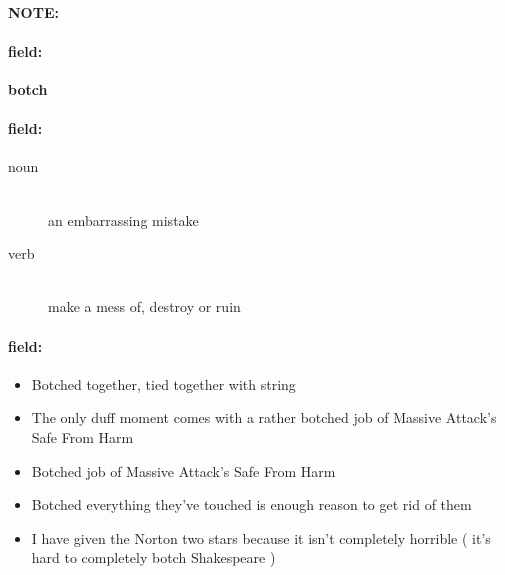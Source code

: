 \documentclass[12pt]{article}
\newenvironment{note}{\paragraph{NOTE:}}{}
\newenvironment{field}{\paragraph{field:}}{}
\begin{document}
\begin{note}
\begin{field}
\textbf{\large botch}
\end{field}


\begin{field}
\begin{description}
\item[noun] \hfill \\ 
an embarrassing mistake

\item[verb] \hfill \\ 
make a mess of, destroy or ruin

\end{description}
\end{field}

\begin{field}
\begin{itemize}
\item Botched together, tied together with string
\item The only duff moment comes with a rather botched job of Massive Attack's Safe From Harm
\item Botched job of Massive Attack's Safe From Harm
\item Botched everything they've touched is enough reason to get rid of them
\item I have given the Norton two stars because it isn't completely horrible ( it's hard to completely botch Shakespeare )
\end{itemize}
\end{field}
\end{note}
\end{document}
